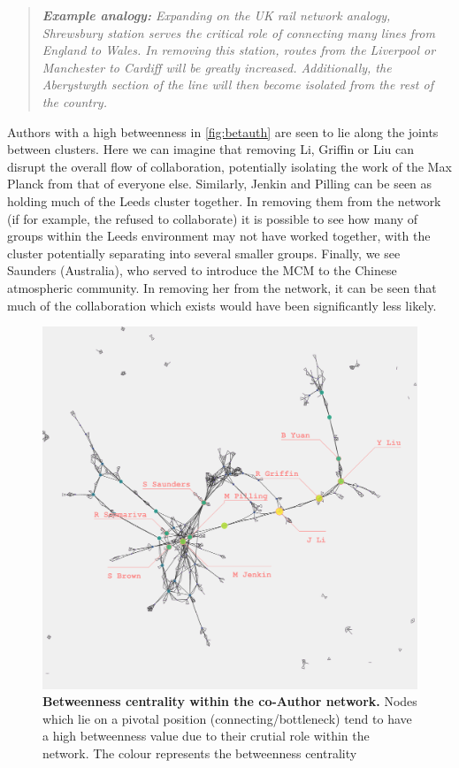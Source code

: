 \begin{quote}
\textit{
\textbf{Example analogy:} Expanding on the UK rail network analogy, Shrewsbury station serves the critical role of connecting many lines from England to Wales. In removing this station, routes from the Liverpool or Manchester to Cardiff will be greatly increased. Additionally, the Aberystwyth section of the line will then become isolated from the rest of the country.
}
\end{quote}

Authors with a high betweenness in \autoref{fig:betauth} are seen to lie along the joints between clusters. Here we can imagine that removing Li, Griffin or Liu can disrupt the overall flow of collaboration, potentially isolating the work of the Max Planck from that of everyone else. Similarly, Jenkin and Pilling can be seen as holding much of the Leeds cluster together. In removing them from the network (if for example, the refused to collaborate) it is possible to see how many of groups within the Leeds environment may not have worked together, with the cluster potentially separating into several smaller groups. Finally, we see Saunders (Australia), who served to introduce the MCM to the Chinese atmospheric community. In removing her from the network, it can be seen that much of the collaboration which exists would have been significantly less likely.

\begin{figure}[H]
     \centering
         \includegraphics[width=.8\textwidth]{figures_c3/betweenauthor.png}
         
        \caption{ \textbf{Betweenness centrality within the co-Author network.} Nodes which lie on a pivotal position (connecting/bottleneck) tend to have a high betweenness value due to their crutial role within the network. The colour represents the betweenness centrality}
        \label{fig:betauth}
\end{figure}



